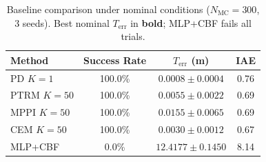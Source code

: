 \begin{table}[t]
\centering
\caption{Baseline comparison under nominal conditions ($N_{\mathrm{MC}}=300$, 3 seeds). Best nominal $T_{\mathrm{err}}$ in \textbf{bold}; MLP+CBF fails all trials.}
\label{tab:baselines}
\begin{tabular}{lccc}
\toprule
Method & Success Rate & $T_{\mathrm{err}}$ (m) & IAE \\
\midrule
  PD $K\!=\!1$ & 100.0\% & $0.0008 \pm 0.0004$ & 0.76 \\
  PTRM $K\!=\!50$ & 100.0\% & $0.0055 \pm 0.0022$ & 0.69 \\
  MPPI $K\!=\!50$ & 100.0\% & $0.0155 \pm 0.0065$ & 0.69 \\
  CEM $K\!=\!50$ & 100.0\% & $0.0030 \pm 0.0012$ & 0.67 \\
  MLP+CBF & 0.0\% & $12.4177 \pm 0.1450$ & 8.14 \\
\bottomrule
\end{tabular}
\end{table}
